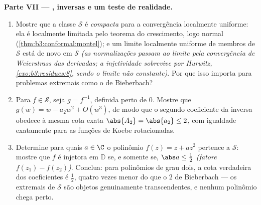 \begin{problem}
\begin{enumerate}[resume]
\end{enumerate}
\medskip
\noindent\textbf{Parte VII --- , inversas e um teste de
realidade.}
\begin{enumerate}[resume]
  \item Mostre que a classe $\mathcal S$ é \emph{compacta} para a convergência
        localmente uniforme: ela é localmente limitada pelo teorema do
        crescimento, logo normal (\cref{thm:b3:conformal:montel}); e um limite
        localmente uniforme de membros de $\mathcal S$ está de novo em $\mathcal S$
        \emph{(as normalizações passam ao limite pela convergência de
        Weierstrass das derivadas; a injetividade sobrevive por
        Hurwitz, \cref{exo:b3:residues:8}, sendo o limite não constante)}. Por que
        isso importa para problemas extremais como o de Bieberbach?
  \item Para $f \in \mathcal S$, seja $g = f^{-1}$, definida perto de $0$. Mostre que
        $g(w) = w - a_2w^2 + O(w^3)$, de modo que o segundo coeficiente da inversa obedece à
        mesma cota exata $\abs{A_2} = \abs{a_2} \leq 2$, com igualdade exatamente para as funções
        de Koebe rotacionadas.
  \item Determine para quais $a \in \C$ o polinômio $f(z)
        = z + az^2$ pertence a $\mathcal S$:
        mostre que $f$ é injetora em $\mathbb D$ se, e somente se, $\abs a \leq \frac12$
        \emph{(fatore $f(z_1) - f(z_2)$)}. Conclua: para polinômios de grau dois, a
        cota verdadeira dos coeficientes é $\frac12$, quatro vezes menor do
        que o $2$ de Bieberbach --- os extremais de $\mathcal S$ são objetos
        genuinamente transcendentes, e nenhum polinômio chega perto.
\end{enumerate}
\end{problem}
